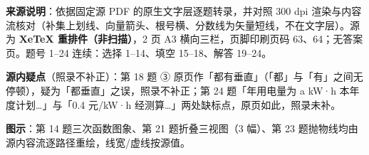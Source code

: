 


\begin{gktip}
\textbf{来源说明}：依据固定源 PDF 的原生文字层逐题转录，并对照 300 dpi 渲染与内容流核对（补集上划线、向量箭头、根号横、分数线为矢量短线，不在文字层）。源为 \textbf{XeTeX 重排件（非扫描）}，2 页 A3 横向三栏，页脚印刷页码 63、64；无答案页。题号 1–24 连续：选择 1–14、填空 15–18、解答 19–24。

\textbf{源内疑点}（照录不补正）：第 18 题 ③ 原页作「都有垂直」（「都」与「有」之间无停顿），疑为「都垂直」之误，照录不补正；第 24 题「年用电量为 a kW·h 本年度计划…」与「0.4 元/kW·h 经测算…」两处缺标点，原页如此，照录未补。

\textbf{图示}：第 14 题三次函数图象、第 21 题折叠三视图（3 幅）、第 23 题抛物线均由源内容流逐路径重绘，线宽/虚线按源值。
\end{gktip}


